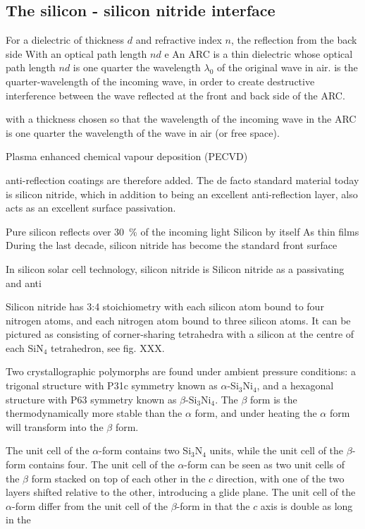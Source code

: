 \documentclass[11pt,bibliography=totoc,index=totoc]{scrbook}   %
\begin{document}
\subsection{The silicon - silicon nitride interface}

For a dielectric of thickness $d$ and refractive index $n$, the reflection from the back side 
With an optical path length $nd$ e
An ARC is a thin dielectric whose optical path length $nd$ is one quarter the wavelength $\lambda_0$ of the original wave in air.
is the quarter-wavelength of the incoming wave, in order to create 
destructive interference between the wave reflected at the front and back side of the ARC.

with a thickness chosen so that the wavelength of the incoming wave in the ARC is one quarter the wavelength of the wave in air (or free space). 

Plasma enhanced chemical vapour deposition (PECVD)\cite{Hoex:2005}

anti-reflection coatings are therefore added. 
The de facto standard material today is silicon nitride, which in addition to being an excellent anti-reflection layer, also acts as an excellent surface passivation. 




Pure silicon reflects over 30~\% of the incoming light
Silicon by itself 
As thin films 
During the last decade, silicon nitride has become the standard front surface

In silicon solar cell technology, silicon nitride is 
Silicon nitride as a passivating and anti

Silicon nitride has 3:4 stoichiometry with each silicon atom bound to four nitrogen atoms,
and each nitrogen atom bound to three silicon atoms. It can be pictured as consisting of 
corner-sharing tetrahedra with a silicon at the centre of each SiN$_4$ tetrahedron, see fig. XXX.

\cite{Riley:2000}

Two crystallographic polymorphs are found under ambient pressure conditions:
a trigonal structure with P31c symmetry known as $\alpha$-Si$_3$Ni$_4$, and a hexagonal structure with P63 symmetry
known as $\beta$-Si$_3$Ni$_4$.
The $\beta$ form is the thermodynamically more stable than the $\alpha$ form, and under heating the $\alpha$ form will transform into the $\beta$ form.
\cite{Riley:2000}

\cite{Morita:1999}

The unit cell of the $\alpha$-form contains two Si$_3$N$_4$ units, while the unit cell of the $\beta$-form contains four.
The unit cell of the $\alpha$-form can be seen as two unit cells of the $\beta$ form stacked on top of each other in the $c$ direction, with one of the two layers shifted relative to the other, introducing a glide plane.
The unit cell of the $\alpha$-form differ from the unit cell of the $\beta$-form in that the $c$ axis is double as long in the 
\end{document}
